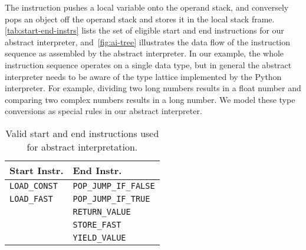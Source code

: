 \documentclass[preprint,10pt]{popl14conf}
\newcommand{\coldata}[1]{\texttt{#1}}
\begin{document}
The \loadFast{} instruction pushes a local variable onto the operand stack, and conversely
\storeFast{} pops an object off the operand stack and stores it in the local stack frame.
\autoref{tab:start-end-instrs} lists the set of eligible start and end instructions for our abstract
interpreter, and~\autoref{fig:ai-tree} illustrates the data flow of the instruction sequence as
assembled by the abstract interpreter.
In our example, the whole instruction sequence operates on a single data type, but in general the
abstract interpreter needs to be aware of the type lattice implemented by the Python interpreter.
For example, dividing two long numbers results in a float number and comparing two complex numbers
results in a long number.
We model these type conversions as special rules in our abstract interpreter.

\begin{table}[t!]
  \centering
  \begin{tabular}{|l|l|}
    \hline
    Start Instr. & End Instr. \\
    \hline
    \hline
    \coldata{LOAD_CONST} & \coldata{POP_JUMP_IF_FALSE} \\
    \coldata{LOAD_FAST}  & \coldata{POP_JUMP_IF_TRUE}  \\
    & \coldata{RETURN_VALUE}      \\
    & \coldata{STORE_FAST}        \\
    & \coldata{YIELD_VALUE}       \\
    \hline
  \end{tabular}
  \caption{Valid start and end instructions used for abstract interpretation.\label{tab:start-end-instrs}}
\end{table}
\end{document}
